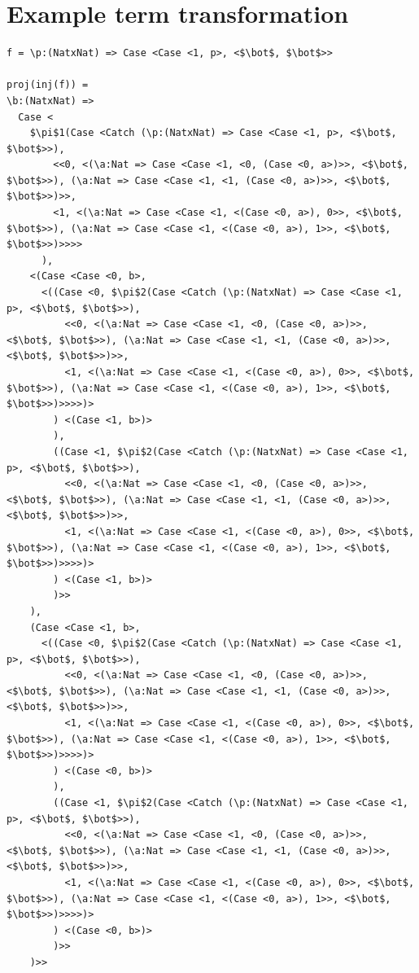\documentclass[12pt,a4paper]{report}
\theoremstyle{definition}
\theoremstyle{definition}
\theoremstyle{remark}
\begin{document}
\chapter{Example term transformation}

\begin{lstlisting}[mathescape, caption={Interpreter logs from applying injection and projection terms. The upper bound on values n = 2, effectively representing the booleans.}]
f = \p:(NatxNat) => Case <Case <1, p>, <$\bot$, $\bot$>>

proj(inj(f)) = 
\b:(NatxNat) => 
  Case <
    $\pi$1(Case <Catch (\p:(NatxNat) => Case <Case <1, p>, <$\bot$, $\bot$>>), 
        <<0, <(\a:Nat => Case <Case <1, <0, (Case <0, a>)>>, <$\bot$, $\bot$>>), (\a:Nat => Case <Case <1, <1, (Case <0, a>)>>, <$\bot$, $\bot$>>)>>,
        <1, <(\a:Nat => Case <Case <1, <(Case <0, a>), 0>>, <$\bot$, $\bot$>>), (\a:Nat => Case <Case <1, <(Case <0, a>), 1>>, <$\bot$, $\bot$>>)>>>>
      ),
    <(Case <Case <0, b>,
      <((Case <0, $\pi$2(Case <Catch (\p:(NatxNat) => Case <Case <1, p>, <$\bot$, $\bot$>>), 
          <<0, <(\a:Nat => Case <Case <1, <0, (Case <0, a>)>>, <$\bot$, $\bot$>>), (\a:Nat => Case <Case <1, <1, (Case <0, a>)>>, <$\bot$, $\bot$>>)>>, 
          <1, <(\a:Nat => Case <Case <1, <(Case <0, a>), 0>>, <$\bot$, $\bot$>>), (\a:Nat => Case <Case <1, <(Case <0, a>), 1>>, <$\bot$, $\bot$>>)>>>>)>
        ) <(Case <1, b>)>
        ), 
        ((Case <1, $\pi$2(Case <Catch (\p:(NatxNat) => Case <Case <1, p>, <$\bot$, $\bot$>>),
          <<0, <(\a:Nat => Case <Case <1, <0, (Case <0, a>)>>, <$\bot$, $\bot$>>), (\a:Nat => Case <Case <1, <1, (Case <0, a>)>>, <$\bot$, $\bot$>>)>>,
          <1, <(\a:Nat => Case <Case <1, <(Case <0, a>), 0>>, <$\bot$, $\bot$>>), (\a:Nat => Case <Case <1, <(Case <0, a>), 1>>, <$\bot$, $\bot$>>)>>>>)>
        ) <(Case <1, b>)>
        )>>
    ),
    (Case <Case <1, b>,
      <((Case <0, $\pi$2(Case <Catch (\p:(NatxNat) => Case <Case <1, p>, <$\bot$, $\bot$>>),
          <<0, <(\a:Nat => Case <Case <1, <0, (Case <0, a>)>>, <$\bot$, $\bot$>>), (\a:Nat => Case <Case <1, <1, (Case <0, a>)>>, <$\bot$, $\bot$>>)>>,
          <1, <(\a:Nat => Case <Case <1, <(Case <0, a>), 0>>, <$\bot$, $\bot$>>), (\a:Nat => Case <Case <1, <(Case <0, a>), 1>>, <$\bot$, $\bot$>>)>>>>)>
        ) <(Case <0, b>)>
        ),
        ((Case <1, $\pi$2(Case <Catch (\p:(NatxNat) => Case <Case <1, p>, <$\bot$, $\bot$>>),
          <<0, <(\a:Nat => Case <Case <1, <0, (Case <0, a>)>>, <$\bot$, $\bot$>>), (\a:Nat => Case <Case <1, <1, (Case <0, a>)>>, <$\bot$, $\bot$>>)>>,
          <1, <(\a:Nat => Case <Case <1, <(Case <0, a>), 0>>, <$\bot$, $\bot$>>), (\a:Nat => Case <Case <1, <(Case <0, a>), 1>>, <$\bot$, $\bot$>>)>>>>)>
        ) <(Case <0, b>)>
        )>>
    )>>

\end{lstlisting}
\end{document}
